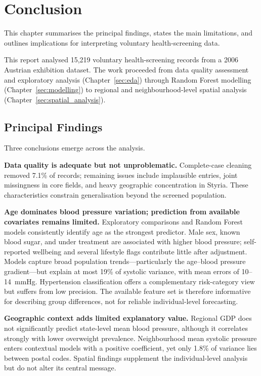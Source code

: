 \chapter{Conclusion}
\label{sec:conclusion}

This chapter summarises the principal findings, states the main limitations, and outlines implications for interpreting voluntary health-screening data.

This report analysed 15,219 voluntary health-screening records from a 2006 Austrian exhibition dataset. The work proceeded from data quality assessment and exploratory analysis (Chapter~\ref{sec:eda}) through Random Forest modelling (Chapter~\ref{sec:modelling}) to regional and neighbourhood-level spatial analysis (Chapter~\ref{sec:spatial_analysis}).

\section{Principal Findings}
\label{sec:conclusion_findings}

Three conclusions emerge across the analysis.

\textbf{Data quality is adequate but not unproblematic.} Complete-case cleaning removed 7.1\% of records; remaining issues include implausible entries, joint missingness in core fields, and heavy geographic concentration in Styria. These characteristics constrain generalisation beyond the screened population.

\textbf{Age dominates blood pressure variation; prediction from available covariates remains limited.} Exploratory comparisons and Random Forest models consistently identify age as the strongest predictor. Male sex, known blood sugar, and under treatment are associated with higher blood pressure; self-reported wellbeing and several lifestyle flags contribute little after adjustment. Models capture broad population trends---particularly the age--blood pressure gradient---but explain at most 19\% of systolic variance, with mean errors of 10--14~mmHg. Hypertension classification offers a complementary risk-category view but suffers from low precision. The available feature set is therefore informative for describing group differences, not for reliable individual-level forecasting.

\textbf{Geographic context adds limited explanatory value.} Regional GDP does not significantly predict state-level mean blood pressure, although it correlates strongly with lower overweight prevalence. Neighbourhood mean systolic pressure enters contextual models with a positive coefficient, yet only 1.8\% of variance lies between postal codes. Spatial findings supplement the individual-level analysis but do not alter its central message.

